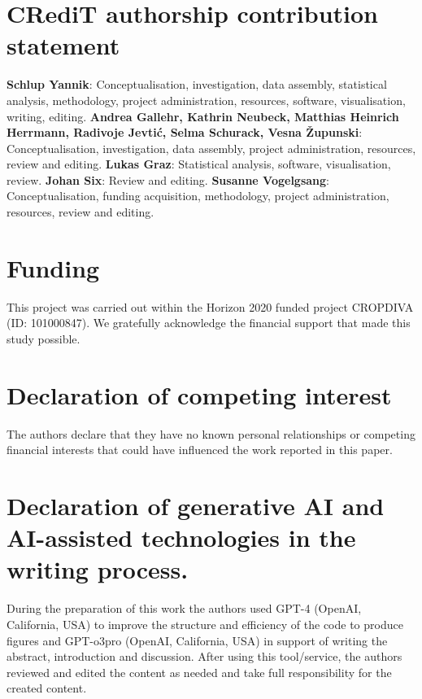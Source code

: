 \documentclass[
  british,
  a4paper,
  DIV=11,
  numbers=noendperiod]{scrreprt}
\begin{document}
\chapter{CRediT authorship contribution
statement}\label{credit-authorship-contribution-statement}

\textbf{Schlup Yannik}: Conceptualisation, investigation, data assembly,
statistical analysis, methodology, project administration, resources,
software, visualisation, writing, editing. \textbf{Andrea Gallehr,
Kathrin Neubeck, Matthias Heinrich Herrmann, Radivoje Jevtić, Selma
Schurack, Vesna Župunski}: Conceptualisation, investigation, data
assembly, project administration, resources, review and editing.
\textbf{Lukas Graz}: Statistical analysis, software, visualisation,
review. \textbf{Johan Six}: Review and editing. \textbf{Susanne
Vogelgsang}: Conceptualisation, funding acquisition, methodology,
project administration, resources, review and editing.

\chapter{Funding}\label{funding}

This project was carried out within the Horizon 2020 funded project
CROPDIVA (ID: 101000847). We gratefully acknowledge the financial
support that made this study possible.

\chapter{Declaration of competing
interest}\label{declaration-of-competing-interest}

The authors declare that they have no known personal relationships or
competing financial interests that could have influenced the work
reported in this paper.

\chapter{Declaration of generative AI and AI-assisted technologies in
the writing
process.}\label{declaration-of-generative-ai-and-ai-assisted-technologies-in-the-writing-process.}

During the preparation of this work the authors used GPT-4 (OpenAI,
California, USA) to improve the structure and efficiency of the code to
produce figures and GPT-o3pro (OpenAI, California, USA) in support of
writing the abstract, introduction and discussion. After using this
tool/service, the authors reviewed and edited the content as needed and
take full responsibility for the created content.
\end{document}
